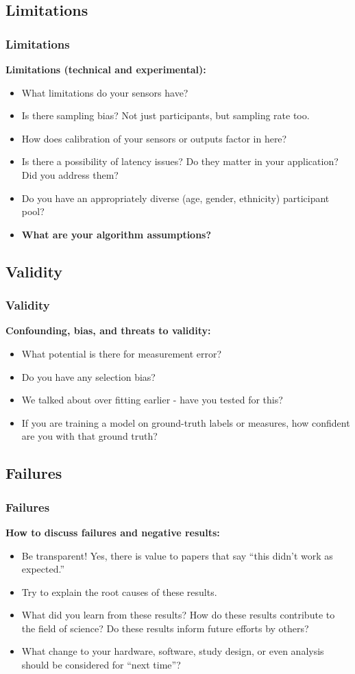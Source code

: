 \documentclass[aspectratio=169]{beamer} %
\begin{document}
	\subsection{Limitations}
	\begin{frame}
	\frametitle{Limitations}
		{\bf Limitations (technical and experimental):}
		\begin{itemize}
			\item What limitations do your sensors have?
			\item Is there sampling bias? Not just participants, but sampling rate too.
			\item How does calibration of your sensors or outputs factor in here?
			\item Is there a possibility of latency issues?  Do they matter in your application?  Did you address them?
			\item Do you have an appropriately diverse (age, gender, ethnicity) participant pool?
			\item {\bf What are your algorithm assumptions?}
		\end{itemize}
	\end{frame}

	\subsection{Validity}
	\begin{frame}
	\frametitle{Validity}
		{\bf Confounding, bias, and threats to validity:}
		\begin{itemize}
			\item What potential is there for measurement error?
			\item Do you have any selection bias?
			\item We talked about over fitting earlier - have you tested for this?
			\item If you are training a model on ground-truth labels or measures, how confident are you with that ground truth?
		\end{itemize}
	\end{frame}

	\subsection{Failures}
	\begin{frame}
	\frametitle{Failures}
		{\bf How to discuss failures and negative results:}
		\begin{itemize}
			\item Be transparent!  Yes, there is value to papers that say ``this didn't work as expected.''
			\item Try to explain the root causes of these results.
			\item What did you learn from these results?  How do these results contribute to the field of science? Do these results inform future efforts by others?
			\item What change to your hardware, software, study design, or even analysis should be considered for ``next time''?
		\end{itemize}
	\end{frame}
\end{document}
